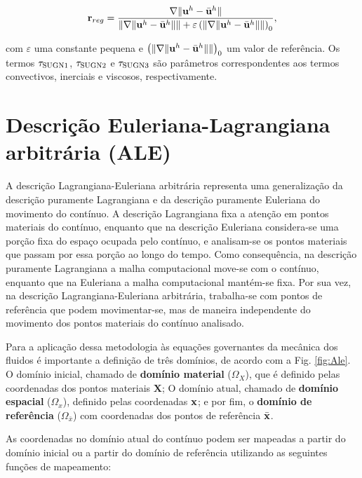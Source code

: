 \documentclass[tese_patricia]{subfiles}%
\begin{document}
\begin{align}
\mathbf{r}_{reg} =\frac{\nabla \lVert\mathbf{u}^h - \bar{\mathbf{u}}^h\rVert}{\lVert \nabla \lVert\mathbf{u}^h - \bar{\mathbf{u}}^h\rVert\rVert + \varepsilon\left(\lVert \nabla \lVert\mathbf{u}^h - \bar{\mathbf{u}}^h\rVert\rVert\right)_0},
\end{align}

\noindent com $\varepsilon$ uma constante pequena e $\left(\lVert \nabla \lVert\mathbf{u}^h- \bar{\mathbf{u}}^h\rVert\rVert\right)_0$ um valor de referência. Os termos $\tau_{\mathrm{SUGN1}}$, $\tau_{\mathrm{SUGN2}}$ e $\tau_{\mathrm{SUGN3}}$ são parâmetros correspondentes aos termos convectivos, inerciais e viscosos, respectivamente.


\section{Descrição Euleriana-Lagrangiana arbitrária (ALE)} \label{Capítulo2:ALE}

A descrição Lagrangiana-Euleriana arbitrária \cite{DoneaGH:1982} representa uma generalização da descrição puramente Lagrangiana e da descrição puramente Euleriana do movimento do contínuo. A descrição Lagrangiana fixa a atenção em pontos materiais do contínuo, enquanto que na descrição Euleriana considera-se uma porção fixa do espaço ocupada pelo contínuo, e analisam-se os pontos materiais que passam por essa porção ao longo do tempo. Como consequência, na descrição puramente Lagrangiana a malha computacional move-se com o contínuo, enquanto que na Euleriana a malha computacional mantém-se fixa. Por sua vez, na descrição Lagrangiana-Euleriana arbitrária, trabalha-se com pontos de referência que podem movimentar-se, mas de maneira independente do movimento dos pontos materiais do contínuo analisado.

Para a aplicação dessa metodologia às equações governantes da mecânica dos fluidos é importante a definição de três domínios, de acordo com a Fig. \ref{fig:Ale}. O domínio inicial, chamado de \textbf{domínio material} ($\Omega_X$), que é definido pelas coordenadas dos pontos materiais $\mathbf{X}$; O domínio atual, chamado de \textbf{domínio espacial} ($\Omega_x$), definido pelas coordenadas $\mathbf{x}$; e por fim, o \textbf{domínio de referência} ($\Omega_{\bar{x}}$) com coordenadas dos pontos de referência $\bar{\mathbf{x}}$. 

As coordenadas no domínio atual do contínuo podem ser mapeadas a partir do domínio inicial ou a partir do domínio de referência utilizando as seguintes funções de mapeamento:  
\end{document}
